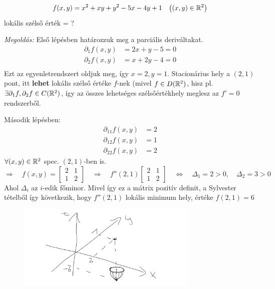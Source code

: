 \documentclass[a4paper,11.5pt]{article}
\begin{document}
	\begin{example}
		\[ f(x,y)=x^2+xy+y^2-5x-4y+1\quad \big((x,y)\in\mathbb{R}^2\big) \]
		lokális szélső érték = ?
		
		\textit{Megoldás:} Első lépésben határozzuk meg a parciális deriváltakat.
		\begin{align*}
			\partial_1f(x,y)&=2x+y-5 = 0\\
			\partial_2f(x,y)&=x+2y-4=0\\
		\end{align*}
		Ezt az egyenletrendszert oldjuk meg, így $x=2, y=1$. Stacionárius hely a $(2,1)$ pont, itt \textbf{lehet} lokális szélső értéke $f$-nek (mivel $f\in D(\mathbb{R}^2)$, hisz pl. $\exists \partial_1f,\partial_2f\in C(\mathbb{R}^2)$, így az összes lehetséges szélsőértékhely meglesz az $f'=0$ rendszerből.
		
		Második lépésben: 
		\begin{align*}
			\partial_{11}f(x,y)&=2 \\
			\partial_{12}f(x,y)&=1 \\
			\partial_{22}f(x,y)&=2 
		\end{align*} 
		$\forall(x,y)\in\mathbb{R}^2$ spec. $(2,1)$-ben is.
		\[ \Rightarrow\quad f(x,y)=\begin{bmatrix}
			2&1\\
			1&2
		\end{bmatrix}\quad \Rightarrow\quad f''(2,1)\begin{bmatrix}
			2&1\\
			1&2
		\end{bmatrix}\quad \Leftrightarrow\quad \varDelta_1=2>0,\quad \varDelta_2=3>0 \]
		Ahol $\varDelta_i$ az $i$-edik főminor. Mivel így ez a mátrix pozitív definit, a Sylvester tételből így következik, hogy $f''(2,1)$ lokális minimum hely, értéke $f(2,1)=6$
		\begin{figure}[H]
			\centering
			\includegraphics[height=4cm]{../2zh/kepek/38.png}
			\caption{}
		\end{figure}
	\end{example}
\end{document}
